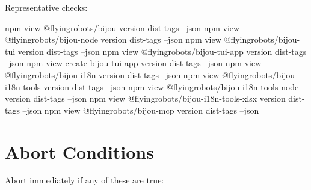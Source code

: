 Representative checks:

\begin{CodeBlock}
npm view @flyingrobots/bijou version dist-tags --json
npm view @flyingrobots/bijou-node version dist-tags --json
npm view @flyingrobots/bijou-tui version dist-tags --json
npm view @flyingrobots/bijou-tui-app version dist-tags --json
npm view create-bijou-tui-app version dist-tags --json
npm view @flyingrobots/bijou-i18n version dist-tags --json
npm view @flyingrobots/bijou-i18n-tools version dist-tags --json
npm view @flyingrobots/bijou-i18n-tools-node version dist-tags --json
npm view @flyingrobots/bijou-i18n-tools-xlsx version dist-tags --json
npm view @flyingrobots/bijou-mcp version dist-tags --json
\end{CodeBlock}

\section{Abort Conditions}\label{record-274-abort-conditions}

Abort immediately if any of these are true:

